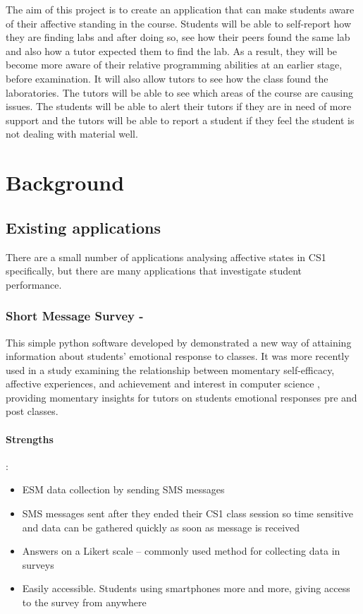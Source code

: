\documentclass{l4proj}
\begin{document}
The aim of this project is to create an application that can make students aware of their affective standing in the course. Students will be able to self-report how they are finding labs and after doing so, see how their peers found the same lab and also how a tutor expected them to find the lab. As a result, they will be become more aware of their relative programming abilities at an earlier stage, before examination. It will also allow tutors to see how the class found the laboratories. The tutors will be able to see which areas of the course are causing issues. The students will be able to alert their tutors if they are in need of more support and the tutors will be able to report a student if they feel the student is not dealing with material well. 

\chapter{Background}

\section{Existing applications}
There are a small number of applications analysing affective states in CS1 specifically, but there are many applications that investigate student performance. 

\label{SMS}\subsection{Short Message Survey - \cite{lishinski_short_2020}}
This simple python software developed by \citeauthor{lishinski_short_2020} demonstrated a new way of attaining information about students' emotional response to classes. It was more recently used in a study examining the relationship between momentary self-efficacy, affective experiences, and achievement and interest in computer science  \citep{lishinski_all_2021}, providing momentary insights for tutors on students emotional responses pre and post classes.
\subsubsection{Strengths}:
\begin{itemize}
    \item ESM data collection by sending SMS messages
    \item SMS messages sent after they ended their CS1 class session so time sensitive and data can be gathered quickly as soon as message is received
    \item Answers on a Likert scale – commonly used method for collecting data in surveys
    \item Easily accessible. Students using smartphones more and more, giving access to the survey from anywhere
\end{itemize}
\end{document}
